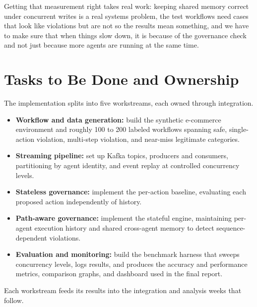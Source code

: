 \documentclass[12pt]{article}
\begin{document}
Getting that measurement right takes real work: keeping shared memory correct under concurrent writes is a real systems problem, the test workflows need cases that look like violations but are not so the results mean something, and we have to make sure that when things slow down, it is because of the governance check and not just because more agents are running at the same time.

\section{Tasks to Be Done and Ownership}
The implementation splits into five workstreams, each owned through integration.

\begin{itemize}
    \item \textbf{Workflow and data generation:} build the synthetic e-commerce environment and roughly 100 to 200 labeled workflows spanning safe, single-action violation, multi-step violation, and near-miss legitimate categories.
    \item \textbf{Streaming pipeline:} set up Kafka topics, producers and consumers, partitioning by agent identity, and event replay at controlled concurrency levels.
    \item \textbf{Stateless governance:} implement the per-action baseline, evaluating each proposed action independently of history.
    \item \textbf{Path-aware governance:} implement the stateful engine, maintaining per-agent execution history and shared cross-agent memory to detect sequence-dependent violations.
    \item \textbf{Evaluation and monitoring:} build the benchmark harness that sweeps concurrency levels, logs results, and produces the accuracy and performance metrics, comparison graphs, and dashboard used in the final report.
\end{itemize}
Each workstream feeds its results into the integration and analysis weeks that follow.
\end{document}
